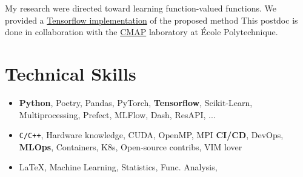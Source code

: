\documentclass[10pt]{article} %
\begin{document}
\begin{paracol}{2}
{My research were directed toward learning function-valued functions. We
provided a  \href{https://bitbucket.org/RomainBrault/itl/}{Tensorflow
implementation} of the proposed method This postdoc is done in collaboration
with the \href{https://portail.polytechnique.edu/cmap/fr}{CMAP} laboratory at
\'Ecole Polytechnique.  }\par %
%
%
\section{Technical Skills}
%
%
%
%
%
%
%
\begin{itemize}[noitemsep]
  \item \textbf{Python}, Poetry, Pandas, PyTorch, \textbf{Tensorflow},
    Scikit-Learn, Multiprocessing, Prefect, MLFlow, Dash, ResAPI, ...
  \item \texttt{C/C++}, Hardware knowledge, CUDA, OpenMP, MPI \textbf{CI/CD},
    DevOps, \textbf{MLOps}, Containers, K8s, Open-source contribs, VIM
    lover
%
%
  \item \LaTeX, Machine Learning, Statistics, Func. Analysis,
\end{itemize}
%
%
%
%
%

\end{paracol}
\end{document}
